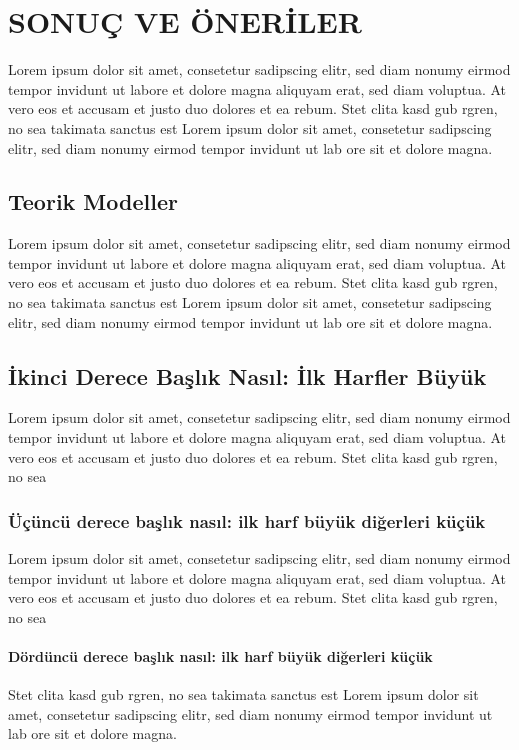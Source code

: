 \chapter{SONUÇ VE ÖNERİLER}
Lorem ipsum dolor sit amet, consetetur sadipscing elitr, sed diam nonumy eirmod tempor invidunt ut labore et dolore magna aliquyam erat, sed diam voluptua. At vero eos et accusam et justo duo dolores et ea rebum. Stet clita kasd gub rgren, no sea takimata sanctus est Lorem ipsum dolor sit amet, consetetur sadipscing elitr, sed diam nonumy eirmod tempor invidunt ut lab ore sit et dolore magna.

\section{Teorik Modeller}
Lorem ipsum dolor sit amet, consetetur sadipscing elitr, sed diam nonumy eirmod tempor invidunt ut labore et dolore magna aliquyam erat, sed diam voluptua. At vero eos et accusam et justo duo dolores et ea rebum. Stet clita kasd gub rgren, no sea takimata sanctus est Lorem ipsum dolor sit amet, consetetur sadipscing elitr, sed diam nonumy eirmod tempor invidunt ut lab ore sit et dolore magna.

\section{İkinci Derece Başlık Nasıl: İlk Harfler Büyük}
Lorem ipsum dolor sit amet, consetetur sadipscing elitr, sed diam nonumy eirmod tempor invidunt ut labore et dolore magna aliquyam erat, sed diam voluptua. At vero eos et accusam et justo duo dolores et ea rebum. Stet clita kasd gub rgren, no sea

\subsection{Üçüncü derece başlık nasıl: ilk harf büyük diğerleri küçük}
Lorem ipsum dolor sit amet, consetetur sadipscing elitr, sed diam nonumy eirmod tempor invidunt ut labore et dolore magna aliquyam erat, sed diam voluptua. At vero eos et accusam et justo duo dolores et ea rebum. Stet clita kasd gub rgren, no sea

\subsubsection{Dördüncü derece başlık nasıl: ilk harf büyük diğerleri küçük}
Stet clita kasd gub rgren, no sea takimata sanctus est Lorem ipsum dolor sit amet, consetetur sadipscing elitr, sed diam nonumy eirmod tempor invidunt ut lab ore sit et dolore magna.

